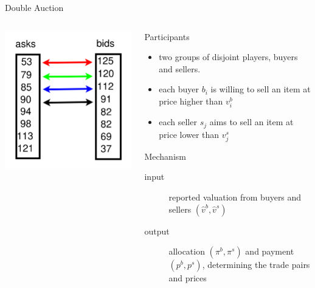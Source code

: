 \documentclass{beamer}
\begin{document}
\begin{frame}{Double Auction}
	\begin{columns}
		\begin{column}{0.2\textwidth}
			\includegraphics[height=0.3\textheight]{double-auction-example}
		\end{column}
		\begin{column}{0.8\textwidth}
			\begin{block}{Participants}
				\begin{itemize}
					\item two groups of disjoint players, buyers and sellers.
					\item each buyer $b_i$ is willing to sell an item at price higher than $v^b_i$
					\item each seller $s_j$ aims to sell an item at price lower than $v^s_j$
				\end{itemize}
			\end{block}
			\begin{block}{Mechanism}
				\begin{description}
					\item[input] reported valuation from buyers and sellers $(\hat v^b, \hat v^s)$
					\item[output] allocation $(\pi^b,\pi^s)$ and payment $(p^b,p^s)$, determining the trade pairs and prices
				\end{description}
			\end{block}
		\end{column}
	\end{columns}

\end{frame}
\end{document}
